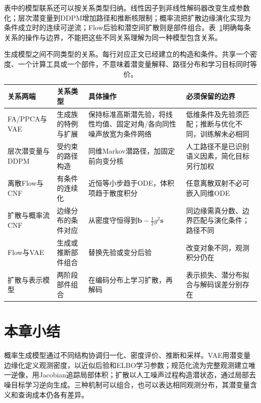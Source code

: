 表中的模型联系还可以按关系类型归纳。线性因子到非线性解码器改变生成参数化；层次潜变量到DDPM增加路径和推断核限制；概率流把扩散边缘演化实现为条件成立时的连续可逆流；Flow后验和潜空间扩散则是部件组合。表~\ref{tab:pgm-generative-typed-relations}明确每条关系的操作与边界，不能把这些不同关系理解为同一种模型包含关系。
\begin{table}[htbp]
  \centering
  \small
  \begin{tabularx}{\linewidth}{@{}lXXX@{}}
    \toprule
    关系两端 & 关系类型 & 具体操作 & 必须保留的边界 \\
    \midrule
    FA/PPCA与VAE & 生成族的特例与扩展 & 保持标准高斯潜先验，将线性均值、固定对角/各向同性噪声放宽为条件网络 & 低维条件及先验须匹配；推断与优化不同，训练解未必相同 \\
    层次潜变量与DDPM & 受约束的路径构造 & 同维Markov潜路径，加固定前向变分核 & 人工路径不是已识别语义因素，简化目标另行加权 \\
    离散Flow与CNF & 有条件的连续化 & 近恒等小步趋于ODE，体积项趋于散度积分 & 任意离散双射不必可嵌入同维ODE \\
    扩散与概率流CNF & 边缘分布的条件对应 & 从密度守恒得到$\bm b-\tfrac12g^2\bm s$ & 同边缘需真分数、边界匹配与演化条件；路径不同 \\
    Flow与VAE & 生成或推断部件组合 & 替换先验或变分后验 & 改变对象不同，观测积分仍在 \\
    扩散与表示模型 & 两阶段部件组合 & 在编码分布上学习扩散，再解码 & 表示损失、潜分布拟合与解码误差分别存在 \\
    \bottomrule
  \end{tabularx}
  \caption{生成模型之间不同类型的关系。每行对应正文已经建立的构造和条件。共享一个密度、一个计算工具或一个部件，不意味着潜变量解释、路径分布和学习目标同时等价。}
  \label{tab:pgm-generative-typed-relations}
\end{table}

\FloatBarrier
\section{本章小结}

\label{sec:pgm-generative-summary}

概率生成模型通过不同结构协调归一化、密度评价、推断和采样。VAE用潜变量边缘化定义观测密度，以近似后验和ELBO学习参数；规范化流为完整观测建立唯一逆像，用Jacobian追踪局部体积；扩散以人工噪声过程构造潜状态，通过局部去噪目标学习逆向生成。三种机制可以组合，也可以表达相同观测分布，其潜变量含义和查询成本仍各有差异。

